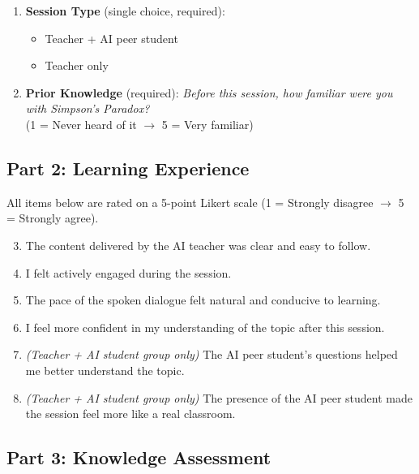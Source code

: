 \documentclass[11pt]{article}
\begin{document}
\begin{enumerate}
  \item \textbf{Session Type} (single choice, required):
    \begin{itemize}
      \item Teacher + AI peer student
      \item Teacher only
    \end{itemize}
  \item \textbf{Prior Knowledge} (required): \emph{Before this session, how
    familiar were you with Simpson's Paradox?} \\
    (1 = Never heard of it $\rightarrow$ 5 = Very familiar)
\end{enumerate}

\subsection*{Part 2: Learning Experience}

All items below are rated on a 5-point Likert scale
(1 = Strongly disagree $\rightarrow$ 5 = Strongly agree).

\begin{enumerate}
  \setcounter{enumi}{2}
  \item The content delivered by the AI teacher was clear and easy to follow.
  \item I felt actively engaged during the session.
  \item The pace of the spoken dialogue felt natural and conducive to
    learning.
  \item I feel more confident in my understanding of the topic after this
    session.
  \item \emph{(Teacher + AI student group only)} The AI peer student's
    questions helped me better understand the topic.
  \item \emph{(Teacher + AI student group only)} The presence of the AI peer
    student made the session feel more like a real classroom.
\end{enumerate}

\subsection*{Part 3: Knowledge Assessment}
\end{document}
